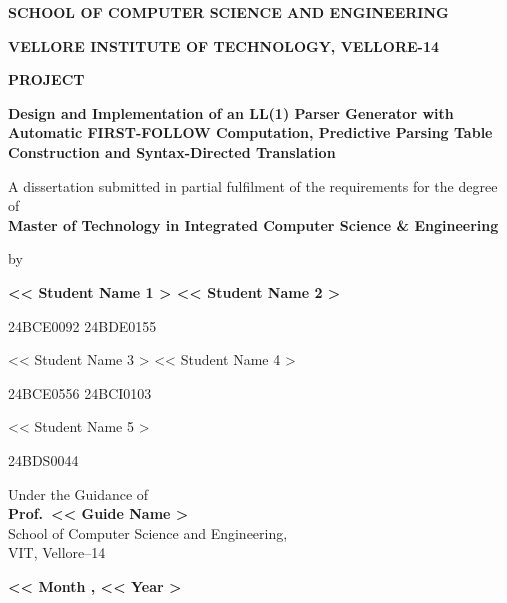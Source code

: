 \documentclass[12pt,a4paper,oneside,openany]{report}
\begin{document}



\begin{titlepage}
\begin{center}
{\bfseries\fontsize{14}{18}\selectfont SCHOOL OF COMPUTER SCIENCE AND ENGINEERING}\par
\vspace{0.6em}
{\bfseries\fontsize{14}{18}\selectfont VELLORE INSTITUTE OF TECHNOLOGY, VELLORE-14}\par
\vspace{2.5em}
{\bfseries\fontsize{14}{18}\selectfont PROJECT\par}
\vspace{2.0em}
{\bfseries\fontsize{16}{20}\selectfont
Design and Implementation of an LL(1) Parser Generator with Automatic
FIRST-FOLLOW Computation, Predictive Parsing Table Construction and
Syntax-Directed Translation\par}
\vspace{2.0em}
{\fontsize{12}{18}\selectfont
A dissertation submitted in partial fulfilment of the requirements for the degree of\\
{\bfseries Master of Technology in Integrated Computer Science \& Engineering}\par}
\vspace{2.0em}
{\fontsize{12}{18}\selectfont by\par}
\vspace{1.2em}
{\bfseries\fontsize{12}{18}\selectfont
<< Student Name 1 \>> \hfill \hspace*{-4em} << Student Name 2 \>>\par
\vspace{0.4em}
24BCE0092 \hfill \hspace*{-4em} 24BDE0155\par
\vspace{0.8em}
<< Student Name 3 \>> \hfill \hspace*{-4em} << Student Name 4 \>>\par
\vspace{0.4em}
24BCE0556 \hfill \hspace*{-4em} 24BCI0103\par
\vspace{0.8em}
<< Student Name 5 \>>\par
24BDS0044\par}
\vspace{1.6em}
{\fontsize{12}{18}\selectfont
Under the Guidance of\\
{\bfseries Prof.\ << Guide Name \>>}\\[0.4em]
School of Computer Science and Engineering,\\
VIT, Vellore--14\par}
\vspace{2.2em}
{\bfseries\fontsize{12}{18}\selectfont << Month \>, << Year \>>\par}
\end{center}
\end{titlepage}
\end{document}
